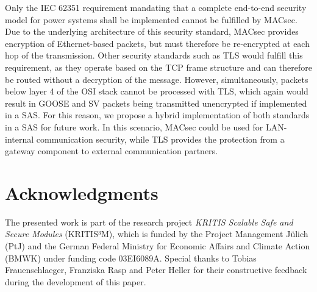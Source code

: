 \documentclass[conference, onecolumn, a4paper]{IEEEtran}
\begin{document}
\smallskip
Only the IEC 62351 requirement mandating that a complete end-to-end security model for power systems shall be implemented \cite{Review_IEC62351:2019} 
cannot be fulfilled by MACsec. Due to the underlying architecture of this security standard, MACsec provides encryption of Ethernet-based packets, but 
must therefore be re-encrypted at each hop of the transmission. Other security standards such as TLS would fulfill this requirement, as they operate based 
on the TCP frame structure and can therefore be routed without a decryption of the message. However, simultaneously, packets below layer 4 of the OSI 
stack cannot be processed with TLS, which again would result in GOOSE and SV packets being transmitted unencrypted if implemented in a SAS. For this 
reason, we propose a hybrid implementation of both standards in a SAS for future work. In this scenario, MACsec could be used for LAN-internal communication 
security, while TLS provides the protection from a gateway component to external communication partners.    

\section{Acknowledgments}
\noindent The presented work is part of the research project \emph{KRITIS Scalable Safe and Secure Modules} (KRITIS³M), which is funded by the Project 
Management J{\"u}lich (PtJ) and the German Federal Ministry for Economic Affairs and Climate Action (BMWK) under funding code 03EI6089A. Special thanks 
to Tobias Frauenschlaeger, Franziska Rasp and Peter Heller for their constructive feedback during the development of this paper.
\printbibliography
\end{document}
